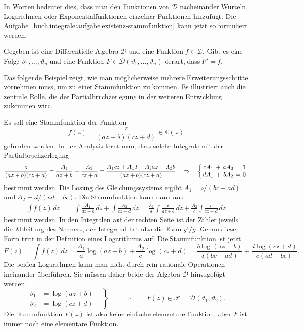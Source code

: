 In Worten bedeutet dies, dass man den Funktionen von $\mathscr{D}$ 
nacheinander Wurzeln, Logarithmen oder Exponentialfunktionen einzelner
Funktionen hinzufügt.
Die Aufgabe~\ref{buch:integrale:aufgabe:existenz-stammfunktion} kann
jetzt so formuliert werden.

\begin{aufgabe}
\label{buch:integrale:aufgabe:existenz-stammfunktion-dalg}
Gegeben ist eine Differentielle Algebra $\mathscr{D}$ und eine
Funktion $f\in \mathscr{D}$.
Gibt es eine Folge $\vartheta_1,\dots,\vartheta_n$ und eine Funktion
$F\in\mathscr{D}(\vartheta_1,\dots,\vartheta_n)$ derart, dass
$F'=f$.
\end{aufgabe}

Das folgende Beispiel zeigt, wie man möglicherweise mehrere 
Erweiterungsschritte vornehmen muss, um zu einer Stammfunktion
zu kommen.
Es illustriert auch die zentrale Rolle, die der Partialbruchzerlegung
in der weiteren Entwicklung zukommen wird.

\begin{beispiel}
\label{buch:integrale:beispiel:nichteinfacheelementarefunktion}
Es soll eine Stammfunktion der Funktion
\[
f(z)
=
\frac{z}{(az+b)(cz+d)}
\in
\mathbb{C}(z)
\]
gefunden werden.
In der Analysis lernt man, dass solche Integrale mit der
Partialbruchzerlegung 
\[
\frac{z}{(az+b)(cz+d)}
=
\frac{A_1}{az+b}+\frac{A_2}{cz+d}
=
\frac{A_1cz+A_1d+A_2az+A_2b}{(az+b)(cz+d)}
\quad\Rightarrow\quad
\left\{
\renewcommand{\arraycolsep}{2pt}
\begin{array}{rcrcr}
cA_1&+&aA_2&=&1\\
dA_1&+&bA_2&=&0
\end{array}
\right.
\]
bestimmt werden.
Die Lösung des Gleichungssystems ergibt
$A_1=b/(bc-ad)$ und $A_2=d/(ad-bc)$.
Die Stammfunktion kann dann aus
\begin{align*}
\int f(z)\,dz
&=
\int\frac{A_1}{az+b}\,dz
+
\int\frac{A_2}{cz+d}\,dz
=
\frac{A_1}{a}\int\frac{a}{az+b}\,dz
+
\frac{A_2}{c}\int\frac{c}{cz+d}\,dz
\end{align*}
bestimmt werden.
In den Integralen auf der rechten Seite ist der Zähler jeweils die
Ableitung des Nenners, der Integrand hat also die Form $g'/g$.
Genau diese Form tritt in der Definition eines Logarithmus auf.
Die Stammfunktion ist jetzt
\[
F(z)
=
\int f(z)\,dz
=
\frac{A_1}{a}\log(az+b)
+
\frac{A_2}{c}\log(cz+d)
=
\frac{b\log(az+b)}{a(bc-ad)}
+
\frac{d\log(cz+d)}{c(ad-bc)}.
\]
Die beiden Logarithmen kann man nicht durch rein rationale Operationen
ineinander überführen.
Sie müssen daher beide der Algebra $\mathscr{D}$ hinzugefügt werden.
\[
\left.
\begin{aligned}
\vartheta_1&=\log(az+b)\\
\vartheta_2&=\log(cz+d)
\end{aligned}
\quad
\right\}
\qquad\Rightarrow\qquad
F(z) \in \mathscr{F}=\mathscr{D}(\vartheta_1,\vartheta_2).
\]
Die Stammfunktion $F(z)$ ist also keine einfache elementare Funktion,
aber $F$ ist immer noch eine elementare Funktion.
\end{beispiel}

